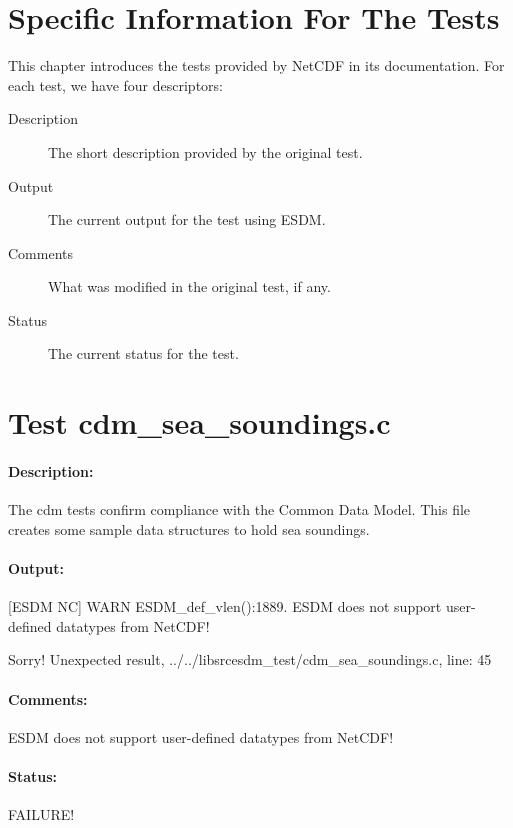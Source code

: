 \section{Specific Information For The Tests}
\label{sec:nctests}

\tab
This chapter introduces the tests provided by NetCDF in its documentation. For each test, we have four descriptors:

\begin{description}

\item[Description] The short description provided by the original test.

\item[Output] The current output for the test using ESDM.

\item[Comments] What was modified in the original test, if any.

\item[Status] The current status for the test.

\end{description}

\section{Test cdm\_sea\_soundings.c}

\paragraph{Description:} The cdm tests confirm compliance with the Common Data Model. This file creates some sample data structures to hold sea soundings.

\paragraph{Output:} [ESDM NC] WARN ESDM\_def\_vlen():1889. ESDM does not support user-defined datatypes from NetCDF!

Sorry! Unexpected result, ../../libsrcesdm\_test/cdm\_sea\_soundings.c, line: 45

\paragraph{Comments:} ESDM does not support user-defined datatypes from NetCDF!

\paragraph{Status:} FAILURE!

